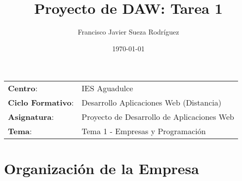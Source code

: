


\title{
\vspace{10ex}
\normalfont \normalsize
\huge \textbf{Proyecto de DAW: Tarea 1}
}
\author{Francisco Javier Sueza Rodríguez}
\date{\normalsize\today}




\maketitle

\thispagestyle{empty}

\vspace{65ex}

\begin{center}
    \begin{tabular}{l l}
        \textbf{Centro}: & IES Aguadulce \\
        \textbf{Ciclo Formativo}: & Desarrollo Aplicaciones Web (Distancia)\\
        \textbf{Asignatura}: & Proyecto de Desarrollo de Aplicaciones Web\\
        \textbf{Tema}: & Tema 1 - Empresas y Programación\\
    \end{tabular}
\end{center}

\newpage

\tableofcontents

\newpage

\section{Organización de la Empresa}

%

